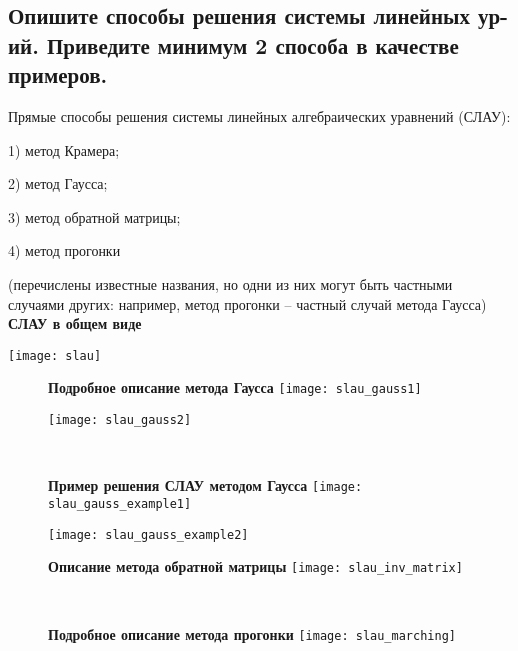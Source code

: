 

\subsection{Опишите способы решения системы линейных ур-ий. Приведите минимум 2 способа в качестве примеров.}

Прямые способы решения системы линейных алгебраических уравнений (СЛАУ):

1) метод Крамера;

2) метод Гаусса;

3) метод обратной матрицы;

4) метод прогонки

(перечислены известные названия, но одни из них могут быть частными случаями других: например, метод прогонки -- частный случай метода Гаусса)
\\

\textbf{СЛАУ в общем виде}

\texttt{[image: slau]}

\begin{figure}[H]
\textbf{Подробное описание метода Гаусса}
\center
\texttt{[image: slau\_gauss1]}
\end{figure}


\begin{figure}[H]
\center
\texttt{[image: slau\_gauss2]}
\end{figure}
\ \\


\begin{figure}[H]
\textbf{Пример решения СЛАУ методом Гаусса}
\center
\texttt{[image: slau\_gauss\_example1]}
\end{figure}

\begin{figure}[H]
\center
\texttt{[image: slau\_gauss\_example2]}
\end{figure}

\begin{figure}[H]
\textbf{Описание метода обратной матрицы}
\center
\texttt{[image: slau\_inv\_matrix]}
\end{figure}
\ \\


\begin{figure}[H]
\textbf{Подробное описание метода прогонки}
\center
\texttt{[image: slau\_marching]}
\end{figure}
\ \\

